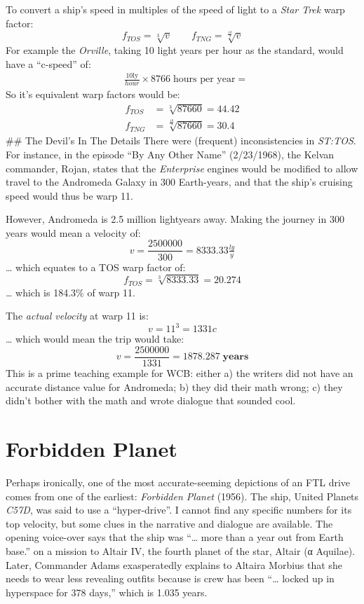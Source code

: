 \documentclass[
  letterpaper,
]{book}
\begin{document}
To convert a ship's speed in multiples of the speed of light to a
\emph{Star Trek} warp factor: \[
f_{TOS} = \sqrt[3]{v} \qquad f_{TNG} = \sqrt[\frac{10}{3}]{v}
\] For example the \emph{Orville}, taking 10 light years per hour as the
standard, would have a ``c-speed'' of: \[
\begin{align}
&\frac{10 \text{ly}}{hour} \times 8766\;\text{hours per year} = 
\end{align}
\] So it's equivalent warp factors would be: \[
\begin{align}
f_{TOS} &= \sqrt[3]{87660} = \mathbf{44.42} \\
f_{TNG} &= \sqrt[\frac{10}{3}]{87660} = \mathbf{30.4}
\end{align}
\] \#\# The Devil's In The Details There were (frequent) inconsistencies
in \emph{ST:TOS}. For instance, in the episode ``By Any Other Name''
(2/23/1968), the Kelvan commander, Rojan, states that the
\emph{Enterprise} engines would be modified to allow travel to the
Andromeda Galaxy in 300 Earth-years, and that the ship's cruising speed
would thus be warp 11.

However, Andromeda is 2.5 million lightyears away. Making the journey in
300 years would mean a velocity of: \[
v = \frac{2500000}{300} = 8333.33\tfrac{ly}{y}
\] \ldots{} which equates to a TOS warp factor of: \[
f_{TOS} = \sqrt[3]{8333.33} = \mathbf{20.274}
\] \ldots{} which is 184.3\% of warp 11.

The \emph{actual velocity} at warp 11 is: \[
v = 11^3 = 1331c
\] \ldots{} which would mean the trip would take: \[
v = \frac{2500000}{1331} = \mathbf{1878.287}\;\textbf{years}
\] This is a prime teaching example for WCB: either a) the writers did
not have an accurate distance value for Andromeda; b) they did their
math wrong; c) they didn't bother with the math and wrote dialogue that
sounded cool.

\chapter{Forbidden Planet}\label{forbidden-planet}

Perhaps ironically, one of the most accurate-seeming depictions of an
FTL drive comes from one of the earliest: \emph{Forbidden Planet}
(1956). The ship, United Planets \emph{C57D}, was said to use a
``hyper-drive''. I cannot find any specific numbers for its top
velocity, but some clues in the narrative and dialogue are available.
The opening voice-over says that the ship was ``\ldots{} more than a
year out from Earth base.'' on a mission to Altair IV, the fourth planet
of the star, Altair (α Aquilae). Later, Commander Adams exasperatedly
explains to Altaira Morbius that she needs to wear less revealing
outfits because is crew has been ``\ldots{} locked up in hyperspace for
378 days,'' which is 1.035 years.
\end{document}

